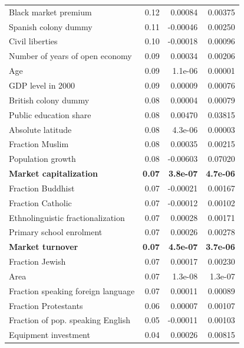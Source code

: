 \begin{refsection}
\begin{table}[!htbp]
\begin{tabular}{lrrr}
		  Black market premium & 0.12 & 0.00084 & 0.00375 \\ 
		  Spanish colony dummy & 0.11 & -0.00046 & 0.00250 \\ 
		  Civil liberties & 0.10 & -0.00018 & 0.00096 \\ 
		  Number of years of open economy & 0.09 & 0.00034 & 0.00206 \\ 
		  Age & 0.09 & 1.1e-06 & 0.00001 \\ 
		  GDP level in 2000 & 0.09 & 0.00009 & 0.00076 \\ 
		  British colony dummy & 0.08 & 0.00004 & 0.00079 \\ 
		  Public education share & 0.08 & 0.00470 & 0.03815 \\ 
		  Absolute latitude & 0.08 & 4.3e-06 & 0.00003 \\ 
		  Fraction Muslim & 0.08 & 0.00035 & 0.00215 \\ 
		  Population growth & 0.08 & -0.00603 & 0.07020 \\ 
		  \textbf{Market capitalization} & \textbf{0.07} & \textbf{3.8e-07} & \textbf{4.7e-06} \\ 
		  Fraction Buddhist & 0.07 & -0.00021 & 0.00167 \\ 
		  Fraction Catholic & 0.07 & -0.00012 & 0.00102 \\ 
		  Ethnolinguistic fractionalization & 0.07 & 0.00028 & 0.00171 \\ 
		  Primary school enrolment & 0.07 & 0.00026 & 0.00278 \\ 
		  \textbf{Market turnover} & \textbf{0.07} & \textbf{4.5e-07} & \textbf{3.7e-06} \\ 
		  Fraction Jewish & 0.07 & 0.00017 & 0.00230 \\ 
		  Area & 0.07 & 1.3e-08 & 1.3e-07 \\ 
		  Fraction speaking foreign language & 0.07 & 0.00011 & 0.00089 \\ 
		  Fraction Protestants & 0.06 & 0.00007 & 0.00107 \\ 
		  Fraction of pop. speaking English & 0.05 & -0.00011 & 0.00103 \\ 
		  Equipment investment & 0.04 & 0.00026 & 0.00815 \\ 
		\bottomrule
	\end{tabular}
\end{table}


\end{refsection}

